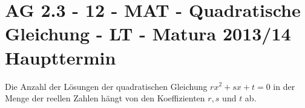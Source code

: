 \section{AG 2.3 - 12 - MAT - Quadratische Gleichung - LT - Matura 2013/14 Haupttermin}

\begin{beispiel}[AG 2.3]{1} %
				Die Anzahl der Lösungen der quadratischen Gleichung $rx^2+sx+t=0$ in der Menge der reellen Zahlen hängt von den Koeffizienten $r,s$ und $t$ ab.
				

\end{beispiel}